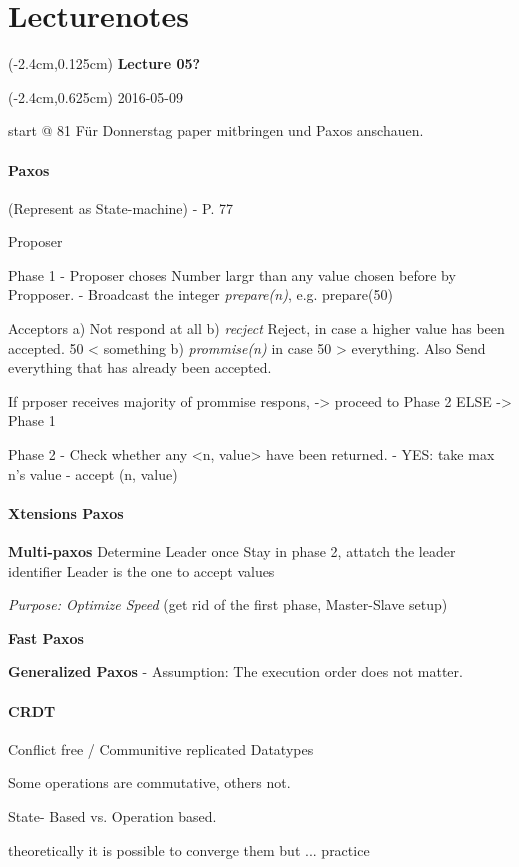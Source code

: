 \documentclass[a4paper,12pt]{article}%
\newcommand{\lecture}[2]{\color{black} 
	
	\begin{textblock*}{3cm}(-2.4cm,0.125cm)
		{\bf Lecture {#1}}
	\end{textblock*}
	
	\begin{textblock*}{3cm}(-2.4cm,0.625cm)
		#2
	\end{textblock*}
}
\begin{document}
\newpage
\section{Lecturenotes}
\lecture{05?}{2016-05-09} start @ 81
Für Donnerstag paper mitbringen und Paxos anschauen.

\paragraph{Paxos} (Represent as State-machine) - P. 77


Proposer


Phase 1
- Proposer choses Number largr than any value chosen before by Propposer. 
- Broadcast the integer {\it prepare(n)}, e.g. prepare(50)

Acceptors
a) Not respond at all
b) {\it recject} Reject, in case a higher value has been accepted. 50 < something
b) {\it prommise(n)} in case 50 > everything. Also Send everything that has already been accepted.

If prposer receives majority of prommise respons, -> proceed to Phase 2 ELSE -> Phase 1

Phase 2
- Check whether any <n, value> have been returned. 
- YES: take max n's value
- accept (n, value)

\paragraph{Xtensions Paxos}
	
	{\bf Multi-paxos}
	Determine Leader once
	Stay in phase 2, attatch the leader identifier
	Leader is the one to accept values
	
	{\it Purpose:  Optimize Speed} (get rid of the first phase, Master-Slave setup)
	
	
	{\bf Fast Paxos}
	
	{\bf Generalized Paxos}
	- Assumption: The execution order does not matter.

\paragraph{CRDT}
Conflict free / Communitive replicated Datatypes

Some operations are commutative, others not.

State- Based vs. Operation based.

theoretically it is possible to converge them but ... practice
\end{document}
